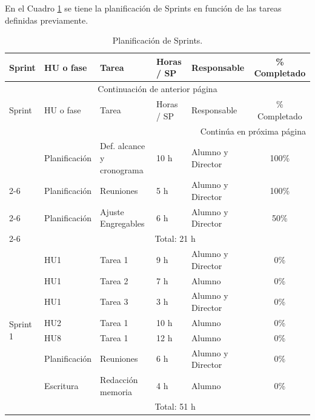 \documentclass[
11pt, %
]{charter}
\begin{document}
En el Cuadro \ref{tab:tareas} se tiene la planificación de Sprints en función de las tareas definidas previamente.

\begin{longtable}{|l|l|p{3cm}|p{1cm}|p{2cm}|c|}
\caption{Planificación de Sprints.}
\label{tab:tareas} \\
\hline
\rowcolor[HTML]{C0C0C0}
Sprint & HU o fase & Tarea & Horas / SP & Responsable & \% Completado \\ \hline \endfirsthead
\multicolumn{6}{c}{{Continuación de anterior página}} \\
\rowcolor[HTML]{C0C0C0}
Sprint & HU o fase & Tarea & Horas / SP & Responsable & \% Completado \\ \hline
\endhead
\hline \multicolumn{6}{|r|}{{Continúa en próxima página}} \\ \hline
\endfoot
\hline \hline
\endlastfoot

\multirow{4}{*}{Sprint 0} 
 & Planificación & Def. alcance y cronograma & 10 h & Alumno y Director & 100\% \\ \cline{2-6} 
 & Planificación & Reuniones & 5 h & Alumno y Director & 100\% \\ \cline{2-6} 
 & Planificación & Ajuste Engregables & 6 h & Alumno y Director & 50\% \\ \cline{2-6} 
 & \multicolumn{5}{|c|}{Total: 21 h} \\ \hline \hline

\multirow{9}{*}{Sprint 1} 
 & HU1 & Tarea 1 & 9 h & Alumno y Director            & 0\% \\ \cline{2-6} 
 & HU1 & Tarea 2 & 7 h & Alumno                       & 0\% \\ \cline{2-6} 
 & HU1 & Tarea 3 & 3 h & Alumno y Director            & 0\% \\ \cline{2-6}
 & HU2 & Tarea 1 & 10 h & Alumno                       & 0\% \\ \cline{2-6} 
 & HU8 & Tarea 1 & 12 h & Alumno                       & 0\% \\ \cline{2-6}
 & Planificación & Reuniones & 6 h & Alumno y Director  & 0\% \\ \cline{2-6}
 & Escritura & Redacción memoria & 4 h & Alumno         & 0\% \\ \cline{2-6}
 & \multicolumn{5}{|c|}{Total: 51 h} \\ \hline \hline


\end{longtable}
\end{document}
